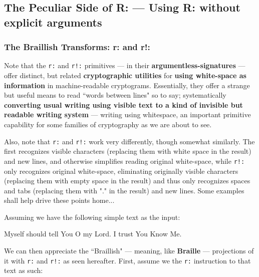 \documentclass[a4paper, 18pt]{book} %
\begin{document}
{{{\vspace{2em}


\subsection{The Peculiar Side of R: --- Using R: without explicit arguments}

\subsubsection{The Braillish Transforms: r: and r!:}

Note that the \texttt{r:} and \texttt{r!:} primitives --- in their \textbf{argumentless-signatures} --- offer distinct, but related \textbf{cryptographic utilities} for \textbf{using white-space as information} in machine-readable cryptograms. Essentially, they offer a strange but useful means to read ``words between lines" so to say; systematically \textbf{converting usual writing using visible text to a kind of invisible but readable writing system} --- writing using whitespace, an important primitive capability for some families of cryptography as we are about to see. 


\vspace{2em}


Also, note that \texttt{r:} and \texttt{r!:} work very differently, though somewhat similarly. The first recognizes visible characters (replacing them with white space in the result) and new lines, and otherwise simplifies reading original white-space, while \texttt{r!:} only recognizes original white-space, eliminating originally visible characters (replacing them with empty space in the result) and thus only recognizes spaces and tabs (replacing them with "." in the result) and new lines. Some examples shall help drive these points home...


\vspace{2em}

Assuming we have the following simple text as the input:


   \begin{tcbverbatim}[title=Sample Text Input]
Myself should tell 
You O my Lord.
I trust You Know Me.
  \end{tcbverbatim}
  
  
  \vspace{2em}
  
  
We can then appreciate the ``Braillish" --- meaning, like \textbf{Braille} --- projections of it with \texttt{r:} and \texttt{r!:} as seen hereafter. First, assume we the \texttt{r:} instruction to that text as such:


}}}
\end{document}
